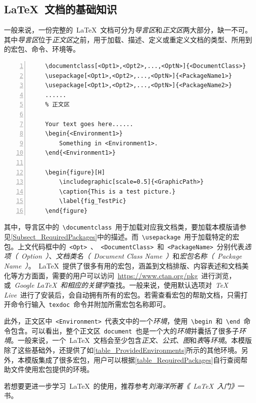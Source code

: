 \subsection{\LaTeX~文档的基础知识}
\label{Subsect_LaTeXBasics}
一般来说，一份完整的~\LaTeX~文档可分为\emph{导言区}和\emph{正文区}两大部分，缺一不可。其中\emph{导言区}位于\emph{正文区}之前，用于加载、描述、定义或重定义文档的类型、所用到的宏包、命令、环境等。
\begin{Verbatim}[gobble=1,frame=single,numbers=left]
	% 导言区
	\documentclass[<Opt1>,<Opt2>,...,<OptN>]{<DocumentClass>}
	\usepackage[<Opt1>,<Opt2>,...,<OptN>]{<PackageName1>}
	\usepackage[<Opt1>,<Opt2>,...,<OptN>]{<PackageName2>}
	......
	% 正文区
	
	Your text goes here......
	\begin{<Environment1>}
		Something in <Environment1>.
	\end{<Environment1>}

	\begin{figure}[H]
		\includegraphic[scale=0.5]{<GraphicPath>}
		\caption{This is a test picture.}
		\label{fig_TestPic}
	\end{figure}

\end{Verbatim}


其中，导言区中的~\verb|\documentclass|~用于加载对应我文档类，要加载本模版请参见\cref{Subsect_RequiredPackages}中的描述。而~\verb|\usepackage|~用于加载特定的宏包。上文代码框中的~\verb|<Opt>|~、~\verb|<DocumentClass>|~和~\verb|<PackageName>|~分别代表\emph{选项（~Option~）}、\emph{文档类名（~Document Class Name~）}和\emph{宏包名称（~Package Name~）}。~\LaTeX~提供了很多有用的宏包，涵盖到文档排版、内容表述和文档美化等方方面面，需要的用户可以访问~\url{https://www.ctan.org/pkg}~进行浏览，或\emph{~Google LaTeX~和相应的关键字}查找。一般来说，使用默认选项对~\emph{TeX Live}~进行了安装后，会自动拥有所有的宏包。若需查看宏包的帮助文档，只需打开命令行输入~\verb|texdoc|~命令并附加所需宏包名称即可。


此外，正文区中~\verb|<Environment>|~代表文中的一个\emph{环境}，使用~\verb|\begin|~和~\verb|\end|~命令包含。可以看出，整个正文区~\verb|document|~也是一个大的\emph{环境}并囊括了很多子\emph{环境}。一般来说，一个~\LaTeX~文档会至少包含\emph{正文}、\emph{公式}、\emph{图}和\emph{表}等\emph{环境}。本模版除了这些基础外，还提供了如\cref{table_ProvidedEnvironments}所示的其他环境。另外，本模版集成了很多宏包，用户可以根据\cref{table_RequiredPackages}自行查阅帮助文件使用宏包提供的环境。


若想要更进一步学习~\LaTeX~的使用，推荐参考\emph{刘海洋所著《~\LaTeX~入门》}一书\cite{Book_LaTeXIntro}。

